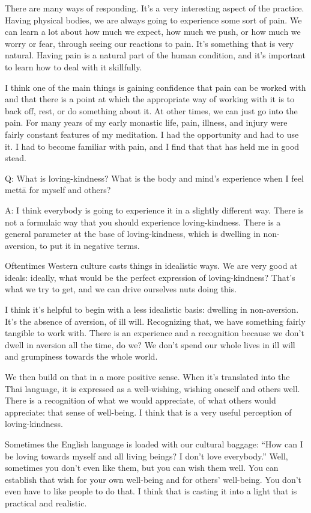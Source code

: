There are many ways of responding. It’s a very interesting aspect of the
practice. Having physical bodies, we are always going to experience some
sort of pain. We can learn a lot about how much we expect, how much we
push, or how much we worry or fear, through seeing our reactions to
pain. It’s something that is very natural. Having pain is a natural part
of the human condition, and it’s important to learn how to deal with it
skillfully.

I think one of the main things is gaining confidence that pain can be
worked with and that there is a point at which the appropriate way of
working with it is to back off, rest, or do something about it. At other
times, we can just go into the pain. For many years of my early monastic
life, pain, illness, and injury were fairly constant features of my
meditation. I had the opportunity and had to use it. I had to become
familiar with pain, and I find that that has held me in good stead.

\qaspace
Q: What is loving-kindness? What is the body and mind’s experience when
I feel mettā for myself and others?

\qaspace
A: I think everybody is going to experience it in a slightly different
way. There is not a formulaic way that you should experience
loving-kindness. There is a general parameter at the base of
loving-kindness, which is dwelling in non-aversion, to put it in
negative terms.

Oftentimes Western culture casts things in idealistic ways. We are very
good at ideals: ideally, what would be the perfect expression of
loving-kindness? That’s what we try to get, and we can drive ourselves
nuts doing this.

I think it’s helpful to begin with a less idealistic basis: dwelling in
non-aversion. It’s the absence of aversion, of ill will. Recognizing
that, we have something fairly tangible to work with. There is an
experience and a recognition because we don’t dwell in aversion all the
time, do we? We don’t spend our whole lives in ill will and grumpiness
towards the whole world.

We then build on that in a more positive sense. When it’s translated
into the Thai language, it is expressed as a well-wishing, wishing
oneself and others well. There is a recognition of what we would
appreciate, of what others would appreciate: that sense of well-being. I
think that is a very useful perception of loving-kindness.

Sometimes the English language is loaded with our cultural baggage: “How
can I be loving towards myself and all living beings? I don't love
everybody.” Well, sometimes you don’t even like them, but you can wish
them well. You can establish that wish for your own well-being and for
others’ well-being. You don’t even have to like people to do that. I
think that is casting it into a light that is practical and realistic.

